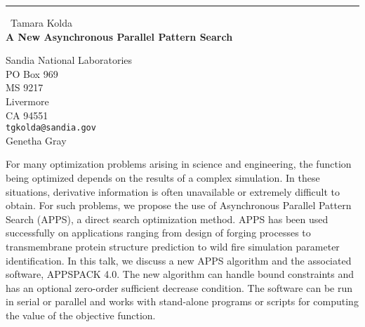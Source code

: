\documentclass{report}
\begin{document}
\begin{center}
\rule{6in}{1pt} \
{\large Tamara Kolda \\
{\bf A New Asynchronous Parallel Pattern Search}}

Sandia National Laboratories \\ PO Box 969 \\ MS 9217 \\ Livermore \\ CA 94551
\\
{\tt tgkolda@sandia.gov}\\
Genetha Gray\end{center}

For many optimization problems arising in science and engineering, the
function being optimized depends on the results of a complex
simulation. In these situations, derivative information is often
unavailable or extremely difficult to obtain. For such problems, we
propose the use of Asynchronous Parallel Pattern Search (APPS), a
direct search optimization method. APPS has been used successfully on
applications ranging from design of forging processes to
transmembrane protein structure prediction to wild fire simulation parameter
identification. In this talk, we discuss a new APPS algorithm and the
associated software, APPSPACK 4.0. The new algorithm can handle bound
constraints and has an optional zero-order sufficient decrease
condition. The software can be run in serial or parallel and works
with stand-alone programs or scripts for computing the value of the
objective function.
\end{document}
